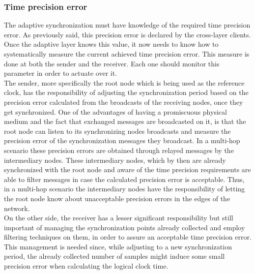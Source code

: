 \subsubsection{Time precision error}
The adaptive synchronization must have knowledge of the required time precision error. As previously said, this precision error is declared by the cross-layer clients. Once the adaptive layer knows this value, it now needs to know how to systematically measure the current achieved time precision error. This measure is done at both the sender and the receiver. Each one should monitor this parameter in order to actuate over it.\\
The sender, more specifically the root node which is being used as the reference clock, has the responsibility of adjusting the synchronization period based on the precision error calculated from the broadcasts of the receiving nodes, once they get synchronized. One of the advantages of having a promiscuous physical medium and the fact that exchanged messages are broadcasted on it, is that the root node can listen to its synchronizing nodes broadcasts and measure the precision error of the synchronization messages they broadcast. In a multi-hop scenario these precision errors are obtained through relayed messages by the intermediary nodes. These intermediary nodes, which by then are already synchronized with the root node and aware of the time precision requirements are able to filter messages in case the calculated precision error is acceptable. Thus, in a multi-hop scenario the intermediary nodes have the responsibility of letting the root node know about unacceptable precision errors in the edges of the network.\\
On the other side, the receiver has a lesser significant responsibility but still important of managing the synchronization points already collected and employ filtering techniques on them, in order to assure an acceptable time precision error. This management is needed since, while adjusting to a new synchronization period, the already collected number of samples might induce some small precision error when calculating the logical clock time.

